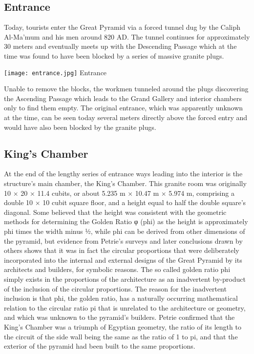 \documentclass[12 pt]{article}
\begin{document}
\subsection{Entrance}
Today, tourists enter the Great Pyramid via a forced tunnel dug by the Caliph Al-Ma'mum and his men around 820 AD. The tunnel continues for approximately 30 meters and eventually meets up with the Descending Passage which at the time was found to have been blocked by a series of massive granite plugs.

\begin{center}
\texttt{[image: entrance.jpg]}
\newline Entrance\newline
\end{center} 

Unable to remove the blocks, the workmen tunneled around the plugs discovering the Ascending Passage which leads to the Grand Gallery and interior chambers only to find them empty. The original entrance, which was apparently unknown at the time, can be seen today several meters directly above the forced entry and would have also been blocked by the granite plugs.
\subsection{King's Chamber}
At the end of the lengthy series of entrance ways leading into the interior is the structure's main chamber, the King's Chamber. This granite room was originally 10 × 20 × 11.4 cubits, or about 5.235 m × 10.47 m × 5.974 m, comprising a double 10 × 10 cubit square floor, and a height equal to half the double square's diagonal. Some believed that the height was consistent with the geometric methods for determining the Golden Ratio φ (phi) as the height is approximately phi times the width minus ½, while phi can be derived from other dimensions of the pyramid, but evidence from Petrie’s surveys and later conclusions drawn by others shows that it was in fact the circular proportions that were deliberately incorporated into the internal and external designs of the Great Pyramid by its architects and builders, for symbolic reasons. The so called golden ratio phi simply exists in the proportions of the architecture as an inadvertent by-product of the inclusion of the circular proportions. The reason for the inadvertent inclusion is that phi, the golden ratio, has a naturally occurring mathematical relation to the circular ratio pi that is unrelated to the architecture or geometry, and which was unknown to the pyramid's builders. Petrie confirmed that the King’s Chamber was a triumph of Egyptian geometry, the ratio of its length to the circuit of the side wall being the same as the ratio of 1 to pi, and that the exterior of the pyramid had been built to the same proportions.
\end{document}
